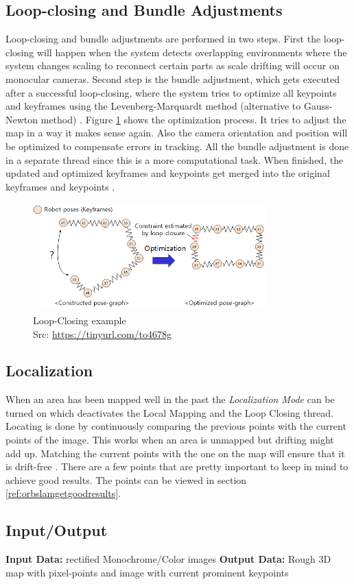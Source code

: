 \subsection{Loop-closing and Bundle Adjustments}
Loop-closing and bundle adjustments are performed in two steps. First the loop-closing will happen when the system detects overlapping environments where the system changes scaling to reconnect certain parts as scale drifting will occur on monocular cameras.\newline
Second step is the bundle adjustment, which gets executed after a successful loop-closing, where the system tries to optimize all keypoints and keyframes using the Levenberg-Marquardt method (alternative to Gauss-Newton method) \cite{LevenbergMarquardMethod}. Figure \ref{img:loopclosing} shows the optimization process. It tries to adjust the map in a way it makes sense again.  Also the camera orientation and position will be optimized to compensate errors in tracking. All the bundle adjustment is done in a separate thread since this is a more computational task.\newline
When finished, the updated and optimized keyframes and keypoints get merged into the original keyframes and keypoints \cite{orbslam2}.\newline
\begin{figure}[h!]
	\centering
	\includegraphics[width=0.8\textwidth]{./media/images/loopclosing.PNG}
  	\caption{Loop-Closing example
  	\\Src: \url{https://tinyurl.com/to4678g}}
  	\label{img:loopclosing}
\end{figure}

\subsection {Localization}
When an area has been mapped well in the past the \textit{Localization Mode} can be turned on which deactivates the Local Mapping and the Loop Closing thread.
Locating is done by continuously comparing the previous points with the current points of the image. This works when an area is unmapped but drifting might add up.
Matching the current points with the one on the map will ensure that it is drift-free \cite{orbslam2}. There are a few points that are pretty important to keep in mind to achieve good results. The points can be viewed in section \ref{ref:orbslamgetgoodresults}.

\subsection{Input/Output}
\textbf{Input Data:} rectified Monochrome/Color images\newline
\textbf{Output Data:} Rough 3D map with pixel-points and image with current prominent keypoints